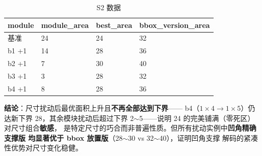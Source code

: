 \documentclass[12pt,a4paper]{article}
\begin{document}
  \begin{table}[H]
  \centering
  \caption{S2 数据}\label{tab:q4s2}
  \begin{tabular}{llll}
  \toprule
  module & module\_area & best\_area & bbox\_version\_area \\
  \midrule
  基准 & 24 & 24 & 32 \\
  b1 +1 & 14 & 28 & 36 \\
  b2 +1 & 7 & 30 & 40 \\
  b3 +1 & 3 & 28 & 32 \\
  b4 +1 & 8 & 28 & 36 \\
  \bottomrule
  \end{tabular}
  \end{table}

\textbf{结论}：尺寸扰动后最优面积上升且\textbf{不再全部达到下界}——
b4（$1\times4\to1\times5$）仍达新下界 28，其余模块扰动后超过下界
2$\sim$5——说明 24 的完美铺满（零死区）对尺寸组合\textbf{敏感}，
是特定尺寸的巧合而非普遍性质。但所有扰动实例中\textbf{凹角精确支撑版
均显著优于 bbox 放置版}（28$\sim$30 vs 32$\sim$40），证明凹角支撑
解码的紧凑性优势对尺寸变化稳健。
\end{document}
